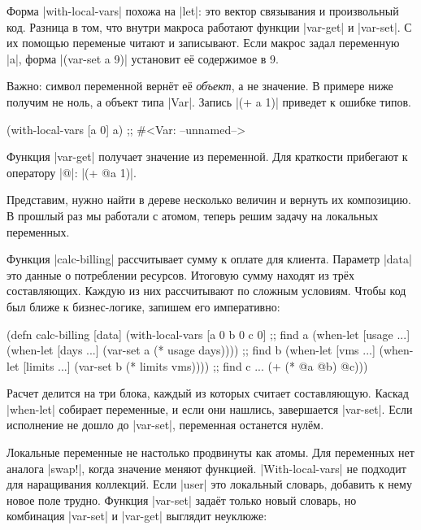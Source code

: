 Форма \spverb|with-local-vars| похожа на \spverb|let|: это вектор связывания и
произвольный код. Разница в том, что внутри макроса работают функции
\spverb|var-get| и \spverb|var-set|. С их помощью переменые читают и
записывают. Если макрос задал переменную \spverb|a|, форма
\spverb|(var-set a 9)| установит е\"{е} содержимое в 9.

Важно: символ переменной верн\"{е}т е\"{е} \emph{объект}, а не значение. В примере ниже
получим не ноль, а объект типа \spverb|Var|. Запись \spverb|(+ a 1)| приведет к
ошибке типов.

\begin{english}
  \begin{clojure}
(with-local-vars [a 0] a)
;; #<Var: --unnamed-->
  \end{clojure}
\end{english}

Функция \spverb|var-get| получает значение из переменной. Для краткости
прибегают к оператору \spverb|@|: \spverb|(+ @a 1)|.

Представим, нужно найти в дереве несколько величин и вернуть их композицию. В
прошлый раз мы работали с атомом, теперь решим задачу на локальных переменных.

Функция \spverb|calc-billing| рассчитывает сумму к оплате для клиента. Параметр
\spverb|data| это данные о потреблении ресурсов. Итоговую сумму находят из трёх
составляющих. Каждую из них рассчитывают по сложным условиям. Чтобы код был
ближе к бизнес-логике, запишем его императивно:

\begin{english}
  \begin{clojure}
(defn calc-billing [data]
  (with-local-vars
    [a 0 b 0 c 0]
    ;; find a
    (when-let [usage ...]
      (when-let [days ...]
        (var-set a (* usage days))))
    ;; find b
    (when-let [vms ...]
      (when-let [limits ...]
        (var-set b (* limits vms))))
    ;; find c ...
    (+ (* @a @b) @c)))
  \end{clojure}
\end{english}

Расчет делится на три блока, каждый из которых считает составляющую. Каскад
\spverb|when-let| собирает переменные, и если они нашлись, завершается
\spverb|var-set|. Если исполнение не дошло до \spverb|var-set|, переменная
останется нул\"{е}м.

Локальные переменные не настолько продвинуты как атомы. Для переменных нет
аналога \spverb|swap!|, когда значение меняют функцией. \spverb|With-local-vars|
не подходит для наращивания коллекций. Если \spverb|user| это локальный словарь,
добавить к нему новое поле трудно. Функция \spverb|var-set| зада\"{е}т только
новый словарь, но комбинация \spverb|var-set| и \spverb|var-get| выглядит
неуклюже:

